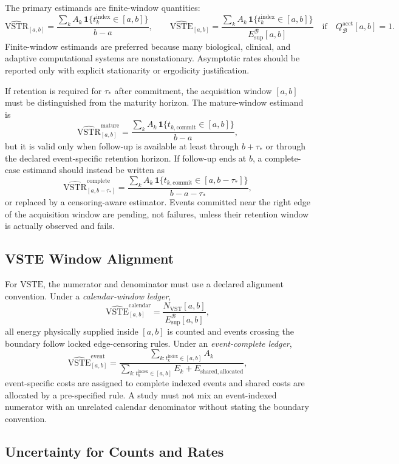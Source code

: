 \documentclass[11pt,a4paper]{article}
\newcommand{\VST}{\ensuremath{\mathrm{VST}}}
\newcommand{\VSTR}{\ensuremath{\mathrm{VSTR}}}
\newcommand{\VSTE}{\ensuremath{\mathrm{VSTE}}}
\newcommand{\1}{\mathbf{1}}
\begin{document}
The primary estimands are finite-window quantities:
\[
  \widehat{\VSTR}_{[a,b]}=
  \frac{\sum_k A_k\,\1\{t_k^{\mathrm{index}}\in[a,b]\}}{b-a},
  \qquad
  \widehat{\VSTE}_{[a,b]}=
  \frac{\sum_k A_k\,\1\{t_k^{\mathrm{index}}\in[a,b]\}}{E_{\mathrm{sup}}^{\mathcal{B}}[a,b]}
  \quad \mathrm{if}\quad Q_{\mathcal{B}}^{\mathrm{acct}}[a,b]=1.
\]
Finite-window estimands are preferred because many biological, clinical, and adaptive computational systems are nonstationary. Asymptotic rates should be reported only with explicit stationarity or ergodicity justification.

If retention is required for $\tau_\ast$ after commitment, the acquisition window $[a,b]$ must be distinguished from the maturity horizon. The mature-window estimand is
\[
  \widehat{\VSTR}^{\mathrm{mature}}_{[a,b]}=
  \frac{\sum_k A_k\,\1\{t_{k,\mathrm{commit}}\in[a,b]\}}{b-a},
\]
but it is valid only when follow-up is available at least through $b+\tau_\ast$ or through the declared event-specific retention horizon. If follow-up ends at $b$, a complete-case estimand should instead be written as
\[
  \widehat{\VSTR}^{\mathrm{complete}}_{[a,b-\tau_\ast]}=
  \frac{\sum_k A_k\,\1\{t_{k,\mathrm{commit}}\in[a,b-\tau_\ast]\}}{b-a-\tau_\ast},
\]
or replaced by a censoring-aware estimator. Events committed near the right edge of the acquisition window are pending, not failures, unless their retention window is actually observed and fails.

\subsection{VSTE Window Alignment}

For \VSTE{}, the numerator and denominator must use a declared alignment convention. Under a \emph{calendar-window ledger},
\[
  \widehat{\VSTE}^{\mathrm{calendar}}_{[a,b]}=
  \frac{N_{\VST}[a,b]}{E_{\mathrm{sup}}^{\mathcal{B}}[a,b]},
\]
all energy physically supplied inside $[a,b]$ is counted and events crossing the boundary follow locked edge-censoring rules. Under an \emph{event-complete ledger},
\[
  \widehat{\VSTE}^{\mathrm{event}}_{[a,b]}=
  \frac{\sum_{k:t_k^{\mathrm{index}}\in[a,b]} A_k}
  {\sum_{k:t_k^{\mathrm{index}}\in[a,b]} E_k + E_{\mathrm{shared,allocated}}},
\]
event-specific costs are assigned to complete indexed events and shared costs are allocated by a pre-specified rule. A study must not mix an event-indexed numerator with an unrelated calendar denominator without stating the boundary convention.

\subsection{Uncertainty for Counts and Rates}
\end{document}
